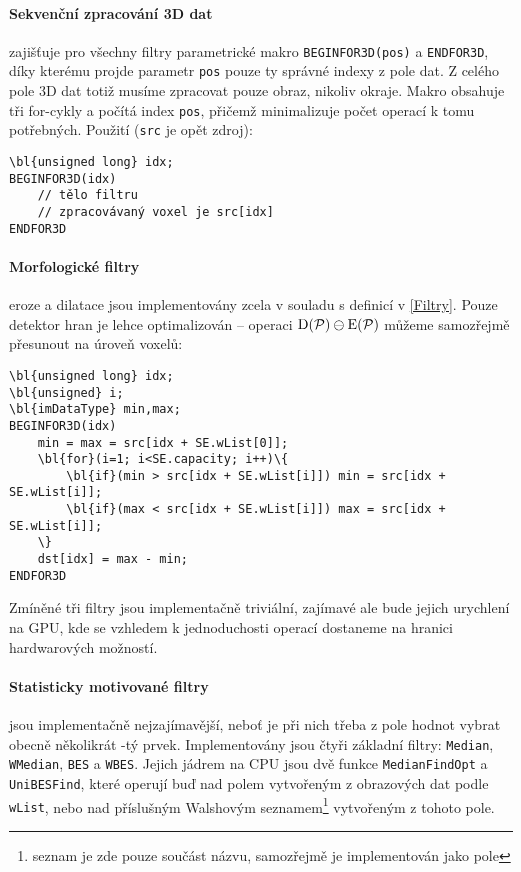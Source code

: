         \paragraph{Sekvenční zpracování 3D dat} zajišťuje pro všechny filtry parametrické makro {\tt BEGINFOR3D(pos)} a {\tt ENDFOR3D}, díky kterému projde parametr {\tt pos} pouze ty správné indexy z pole dat. Z celého pole 3D dat totiž musíme zpracovat pouze obraz, nikoliv okraje. Makro obsahuje tři for-cykly a počítá index {\tt pos}, přičemž minimalizuje počet operací k tomu potřebných. Použití ({\tt src} je opět zdroj):

        \begin{Verbatim}[commandchars = \\\{\}]
\bl{unsigned long} idx;
BEGINFOR3D(idx)
    // tělo filtru
    // zpracovávaný voxel je src[idx]
ENDFOR3D
        \end{Verbatim}

        \paragraph{Morfologické filtry} eroze a dilatace jsou implementovány zcela v souladu s definicí v \ref{Filtry}. Pouze detektor hran je lehce optimalizován -- operaci $\mathrm{D}(\mathcal{P}) \ominus \mathrm{E}(\mathcal{P})$ můžeme samozřejmě přesunout na úroveň voxelů:

        \begin{Verbatim}[commandchars = \\\{\}]
\bl{unsigned long} idx;
\bl{unsigned} i;
\bl{imDataType} min,max;
BEGINFOR3D(idx)
    min = max = src[idx + SE.wList[0]];
    \bl{for}(i=1; i<SE.capacity; i++)\{
        \bl{if}(min > src[idx + SE.wList[i]]) min = src[idx + SE.wList[i]];
        \bl{if}(max < src[idx + SE.wList[i]]) max = src[idx + SE.wList[i]];
    \}
    dst[idx] = max - min;
ENDFOR3D
        \end{Verbatim}

        Zmíněné tři filtry jsou implementačně triviální, zajímavé ale bude jejich urychlení na GPU, kde se vzhledem k jednoduchosti operací dostaneme na hranici hardwarových možností.

        \paragraph{Statisticky motivované filtry} jsou implementačně nejzajímavější, neboť je při nich třeba z pole hodnot vybrat obecně několikrát \kk-tý prvek. Implementovány jsou čtyři základní filtry: {\tt Median}, {\tt WMedian}, {\tt BES} a {\tt WBES}. Jejich jádrem na CPU jsou dvě funkce {\tt MedianFindOpt} a {\tt UniBESFind}, které operují buď nad polem vytvořeným z obrazových dat podle {\tt wList}, nebo nad příslušným Walshovým seznamem\footnote{seznam je zde pouze součást názvu, samozřejmě je implementován jako pole} vytvořeným z tohoto pole.

